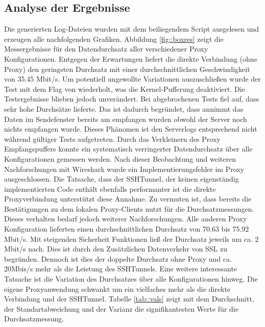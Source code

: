 \documentclass[12pt, a4paper]{scrartcl}
\begin{document}
\subsection{Analyse der Ergebnisse}
Die generierten Log-Dateien wurden mit dem beiliegendem Script ausgelesen und erzeugen alle nachfolgenden Grafiken.
\noindent Abbildung \@\ref{fig::boxres} zeigt die Messergebnisse für den Datendurchsatz aller verschiedener Proxy Konfigurationen. Entgegen der Erwartungen liefert die direkte Verbindung (ohne Proxy) den geringsten Durchsatz mit einer durchschnittlichen Geschwindigkeit von 35.45 Mbit/s.
Um potentiell ungewollte Variationen auszuschließen wurde der Test mit dem  Flag von  wiederholt, was die Kernel-Pufferung deaktiviert. Die Testergebnisse blieben jedoch unverändert.\newline
Bei abgebrochenen Tests fiel auf, dass  sehr hohe Durchsätze lieferte. Das ist dadurch begründet, dass  annimmt das Daten im Sendefenster bereits am empfangen wurden obwohl der Server noch nichts empfangen wurde. Dieses Phänomen ist den Serverlogs entsprechend nicht während gültiger Tests aufgetreten. Durch das Verkleinern des Proxy Empfangspuffers konnte ein systematisch verringerter Datendurchsatz über alle Konfigurationen gemessen werden. Nach dieser Beobachtung und weiteren Nachforschungen mit Wireshark wurde ein Implementierungsfehler im Proxy ausgeschlossen. Die Tatsache, dass der SSHTunnel, der keinen eigenständig implementierten Code enthält ebenfalls performanter ist die direkte Proxyverbindung unterstützt diese Annahme. Zu vermuten ist, dass  bereits die Bestätigungen zu dem lokalen Proxy-Clients nutzt für die Durchsatzmessungen. Dieses verhalten bedarf jedoch weiterer Nachforschungen.\newline
Alle anderen Proxy Konfiguration lieferten einen durchschnittlichen Durchsatz von 70.63 bis 75.92 Mbit/s. Mit steigenden Sicherheit Funktionen ließ der Durchsatz jeweils um ca. 2 Mbit/s nach. Dies ist durch den Zusätzlichen Datenverkehr von \ac{SSL} zu begründen. Dennoch ist dies der doppelte Durchsatz ohne Proxy und ca. 20Mbis/s mehr als die Leistung des SSHTunnels. Eine weitere interessante Tatsache ist die Variation des Durchsatzes über alle Konfigurationen hinweg. Die eigene Proxyanwendung schwankt um ein vielfaches mehr als die direkte Verbindung und der SSHTunnel. Tabelle \ref{tab::vals} zeigt mit dem Durchschnitt, der Standartabweichung und der Varianz die signifikantesten Werte für die Durchsatzmessung.\newline
\end{document}
